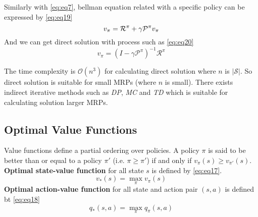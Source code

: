 \documentclass[
	10pt, %
]{article}
\theoremstyle{plain}
\newcommand{\mbb}[1]{\mathbb{#1}}
\newcommand{\mc}[1]{\mathcal{#1}}
\newcommand{\tb}[1]{\textbf{#1}}
\newcommand{\ti}[1]{\textit{#1}}
\numberwithin{equation}{subsection} %
\begin{document}
Similarly with \cref{eq:eq7}, bellman equation related with a specific policy can be expressed by \cref{eq:eq19}
\begin{equation} \label{eq:eq19}
    v_\pi = \mc{R}^\pi + \gamma \mc{P}^\pi v_\pi\\
\end{equation}
And we can get direct solution with process such as \cref{eq:eq20}
\begin{equation} \label{eq:eq20}
    v_\pi = (I - \gamma \mc{P}^\pi)^{-1} \mc{R}^\pi
\end{equation}

The time complexity is $\mc{O}(n^3)$ for calculating direct solution where $n$ is $|\mc{S}|$.
So direct solution is suitable for small MRPs (where $n$ is small).
There exists indirect iterative methods such as \ti{DP}, \ti{MC} and \ti{TD} which is suitable for calculating solution larger MRPs.

\subsection{Optimal Value Functions}
Value functions define a partial ordering over policies. A policy $\pi$ is said to be better than or equal to a policy $\pi'$ (i.e. $\pi \geq \pi'$) if and only if $v_\pi(s) \geq v_{\pi'}(s)$.
\tb{Optimal state-value function} for all state $s$ is defined by \cref{eq:eq17}.
\begin{equation} \label{eq:eq17}
    v_*(s) = \max_{\pi} v_\pi(s)
\end{equation}
\tb{Optimal action-value function} for all state and action pair $(s, a)$ is defined bt \cref{eq:eq18}
\begin{equation} \label{eq:eq18}
    q_*(s,a) = \max_\pi q_\pi(s,a)
\end{equation}
\end{document}

